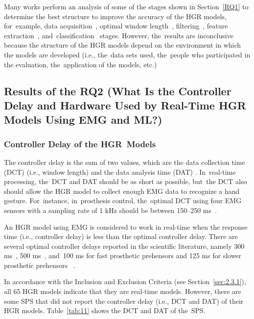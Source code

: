 \documentclass[sensors,review,accept,moreauthors,pdftex]{Definitions/mdpi}
\begin{document}
Many works perform an analysis of some of the stages shown in Section~\ref{RQ1} to determine the best structure to improve the accuracy of the HGR models, for~example, data acquisition~\cite{toledo2019study,li2010quantifying,hargrove2007real,Englehart2003}, optimal window length~\cite{Smith2011}, filtering~\cite{chowdhury2013surface,disselhorst1997improvement}, feature extraction~\cite{phinyomark2018feature}, and~classification~\cite{toledo2019support,nazmi2016review} stages. However, the~results are inconclusive because the structure of the HGR models depend on the environment in which the models are developed (i.e., the~data sets used, the~people who participated in the evaluation, the~application of the models, etc.)  

\subsection{Results of the RQ2 (What Is the Controller Delay and Hardware Used by Real-Time HGR Models Using EMG and ML?)}
\unskip

\subsubsection{Controller Delay of the HGR~Models } \label{time}

The controller delay is the sum of two values, which are the data collection time (DCT) (i.e., window length) and the data analysis time (DAT) \cite{Englehart2003,Farrel2007}. In~real-time processing, the~DCT and DAT should be as short as possible, but~the DCT also should allow the HGR model to collect enough EMG data to recognize a hand gesture. For~instance, in~prosthesis control, the~optimal DCT using four EMG sensors with a sampling rate of 1 kHz should be between 150--250 ms~\cite{Smith2011}.

An HGR model using EMG is considered to work in real-time when the response time (i.e., controller delay) is less than the optimal controller delay. There are several optimal controller delays reported in the scientific literature, namely 300 ms~\cite{Englehart2003}, 500 ms~\cite{Graupe1983}, and~100 ms for fast prosthetic prehensors and 125 ms for slower prosthetic prehensors %
~\cite{Farrel2007}. 

In accordance with the Inclusion and Exclusion Criteria (see Section~\ref{sec:2.3.1}), all 65 HGR models indicate that they are real-time models. However, there are some SPS that did not report the controller delay (i.e., DCT and DAT) of their HGR models. Table~\ref{tab:11} shows the DCT and DAT of the~SPS.
\end{document}
